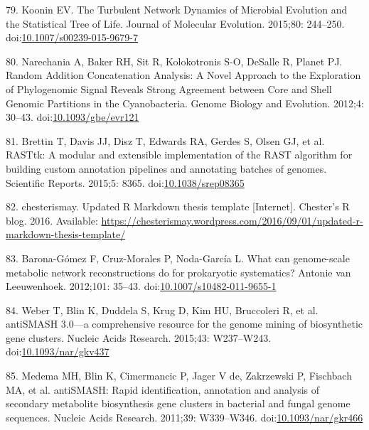 \documentclass[12pt,twoside]{reedthesis}
\begin{document}
  \hypertarget{ref-kooninux5fturbulentux5f2015}{}
  79. Koonin EV. The Turbulent Network Dynamics of Microbial Evolution and
  the Statistical Tree of Life. Journal of Molecular Evolution. 2015;80:
  244--250.
  doi:\href{https://doi.org/10.1007/s00239-015-9679-7}{10.1007/s00239-015-9679-7}
  
  \hypertarget{ref-narechaniaux5frandomux5f2012}{}
  80. Narechania A, Baker RH, Sit R, Kolokotronis S-O, DeSalle R, Planet
  PJ. Random Addition Concatenation Analysis: A Novel Approach to the
  Exploration of Phylogenomic Signal Reveals Strong Agreement between Core
  and Shell Genomic Partitions in the Cyanobacteria. Genome Biology and
  Evolution. 2012;4: 30--43.
  doi:\href{https://doi.org/10.1093/gbe/evr121}{10.1093/gbe/evr121}
  
  \hypertarget{ref-brettinux5frasttk:ux5f2015}{}
  81. Brettin T, Davis JJ, Disz T, Edwards RA, Gerdes S, Olsen GJ, et al.
  RASTtk: A modular and extensible implementation of the RAST algorithm
  for building custom annotation pipelines and annotating batches of
  genomes. Scientific Reports. 2015;5: 8365.
  doi:\href{https://doi.org/10.1038/srep08365}{10.1038/srep08365}
  
  \hypertarget{ref-chesterismayux5fupdatedux5f2016}{}
  82. chesterismay. Updated R Markdown thesis template {[}Internet{]}.
  Chester's R blog. 2016. Available:
  \url{https://chesterismay.wordpress.com/2016/09/01/updated-r-markdown-thesis-template/}
  
  \hypertarget{ref-barona-gomezux5fwhatux5f2012}{}
  83. Barona-Gómez F, Cruz-Morales P, Noda-García L. What can genome-scale
  metabolic network reconstructions do for prokaryotic systematics?
  Antonie van Leeuwenhoek. 2012;101: 35--43.
  doi:\href{https://doi.org/10.1007/s10482-011-9655-1}{10.1007/s10482-011-9655-1}
  
  \hypertarget{ref-weberux5fantismashux5f2015}{}
  84. Weber T, Blin K, Duddela S, Krug D, Kim HU, Bruccoleri R, et al.
  antiSMASH 3.0---a comprehensive resource for the genome mining of
  biosynthetic gene clusters. Nucleic Acids Research. 2015;43: W237--W243.
  doi:\href{https://doi.org/10.1093/nar/gkv437}{10.1093/nar/gkv437}
  
  \hypertarget{ref-medemaux5fantismash:ux5f2011}{}
  85. Medema MH, Blin K, Cimermancic P, Jager V de, Zakrzewski P,
  Fischbach MA, et al. antiSMASH: Rapid identification, annotation and
  analysis of secondary metabolite biosynthesis gene clusters in bacterial
  and fungal genome sequences. Nucleic Acids Research. 2011;39:
  W339--W346.
  doi:\href{https://doi.org/10.1093/nar/gkr466}{10.1093/nar/gkr466}


\end{document}
